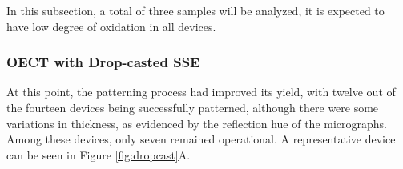 In this subsection, a total of three samples will be analyzed, it is expected to have low degree of oxidation in all devices.


\subsubsection{OECT with Drop-casted SSE}%
At this point, the patterning process had improved its yield, with twelve out of the fourteen devices being successfully patterned, although there were some variations in thickness, as evidenced by the reflection hue of the micrographs. Among these devices, only seven remained operational. A representative device can be seen in Figure \ref{fig:dropcast}A.  %

